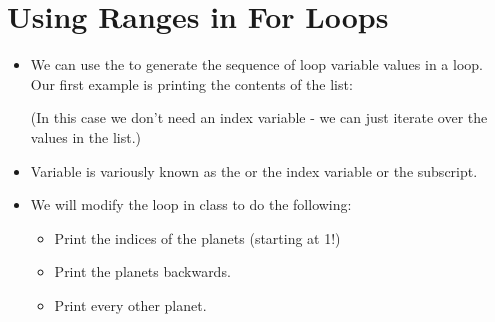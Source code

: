 \documentclass[letterpaper,10pt,english]{sphinxmanual}
\begin{document}
\section{Using Ranges in For Loops}
\label{\detokenize{lecture_notes/lec12_loops2_for_double:using-ranges-in-for-loops}}\begin{itemize}
\item {} 
We can use the  to generate the sequence of loop variable
values in a  loop. Our first example is printing the contents of
the  list:

\begin{sphinxVerbatim}[commandchars=\\\{\}]
  \PYG{p}{[}    
       \PYG{p}{]}
   
    \PYG{p}{[}\PYG{p}{]}
\end{sphinxVerbatim}

(In this case we don’t need an index variable - we can just iterate
over the values in the list.)

\item {} 
Variable  is variously known as the  or the 
index variable or the subscript.

\item {} 
We will modify the loop in class to do the following:
\begin{itemize}
\item {} 
Print the indices of the planets (starting at 1!)

\item {} 
Print the planets backwards.

\item {} 
Print every other planet.

\end{itemize}

\end{itemize}
\end{document}
